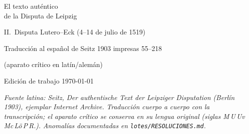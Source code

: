 \documentclass[11pt,a4paper,twoside]{article}
\begin{document}
\begin{titlepage}
\centering
{\LARGE El texto aut\'entico\\de la Disputa de Leipzig\par}
\vspace{1em}
{\large II.\ Disputa Lutero--Eck (4--14 de julio de 1519)\par}
\vspace{2em}
{\normalsize Traducci\'on al espa\~nol de Seitz 1903 \textperiodcentered{} impresas 55--218\par}
{\small (aparato cr\'itico en lat\'in/alem\'an)\par}
\vfill
{\small Edici\'on de trabajo \textperiodcentered{} \today\par}
\end{titlepage}
\noindent\textit{Fuente latina: Seitz, Der authentische Text der Leipziger Disputation (Berl\'in 1903), ejemplar Internet Archive. Traducci\'on cuerpo a cuerpo con la transcripci\'on; el aparato cr\'itico se conserva en su lengua original (siglas M\,U\,Uv\,Mc\,L\"o\,P\,R.). Anomal\'ias documentadas en \texttt{lotes/RESOLUCIONES.md}.}

\bigskip



\end{document}
